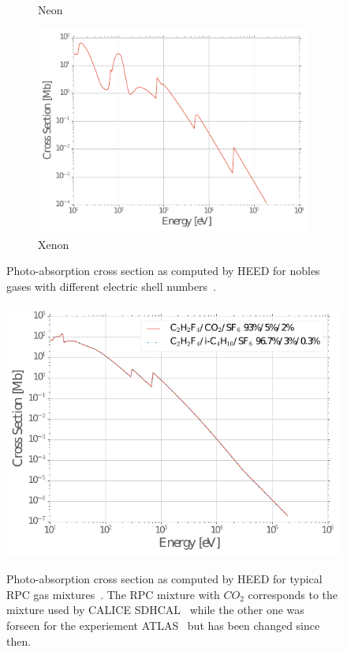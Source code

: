 \begin{figure}[H]
\begin{subfigure}{0.5\linewidth}
			\caption{\label{fig:PAIR:C} Neon}
		\end{subfigure}
		\begin{subfigure}{0.5\linewidth}
			\centering
			\includegraphics[width = 0.5\plotwidth]{fig/chapt4/HEED-Xenon.pdf}
			\caption{\label{fig:PAIR:D} Xenon}
		\end{subfigure}
		\caption{\label{fig:PAIR} Photo-absorption cross section as computed by HEED for nobles gases with different electric shell numbers~\cite{VINCENT2017}.}
	\end{figure}
	
	\begin{figure}[H]
		\centering
		\includegraphics[width = 0.7\plotwidth]{fig/chapt4/HEED-RPC.pdf}\\
		\caption{\label{fig:PAIR-RPC} Photo-absorption cross section as computed by HEED for typical RPC gas mixtures~\cite{VINCENT2017}. The RPC mixture with $CO_2$ corresponds to the mixture used by CALICE SDHCAL~\cite{ARNAUD2015} while the other one was forseen for the experiement ATLAS~\cite{RIEGLER2003} but has been changed since then.}
	\end{figure}
	
